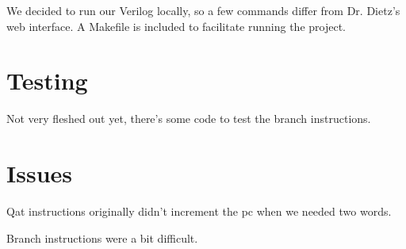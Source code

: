 \documentclass{sig-alternate-05-2015}
\begin{document}
We decided to run our Verilog locally, so a few commands differ from Dr. Dietz's web interface. A Makefile is included to facilitate running the project.

\vfill\pagebreak

\section{Testing}

Not very fleshed out yet, there's some code to test the branch instructions.

\section{Issues}

Qat instructions originally didn't increment the pc when we needed two words.

Branch instructions were a bit difficult.
\end{document}
